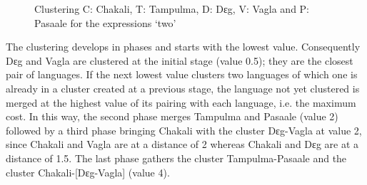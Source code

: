\begin{figure}[h!]

 \centering
\qquad
{}

 

\caption[Clustering   Chakali, Tampulma,  Dɛg, Vagla and  Pasaale 
for the
expressions  `two']{Clustering  C: Chakali, T: Tampulma, D: Dɛg, V: Vagla and P:
Pasaale 
for the
expressions  `two'\label{fig:NUM-align-quant-two-EXE}}
\end{figure}






The clustering develops in phases and starts
with the lowest value. Consequently  Dɛg and Vagla are clustered at the initial
stage (value 0.5); they are the closest pair of languages.   If  the next lowest
value clusters two languages of which one is already in a cluster created at a
previous stage, the language not yet clustered is merged at the highest value of
its pairing with each language, i.e. the maximum cost.  In this way, the second
phase
merges Tampulma and Pasaale (value 2)  followed by a third phase bringing
Chakali with the cluster Dɛg-Vagla at value
2,  since Chakali and Vagla
are at a distance of 2 whereas Chakali and Dɛg are at a distance of 1.5.  The
last phase gathers the
cluster Tampulma-Pasaale and the cluster Chakali-[Dɛg-Vagla]  (value 4).




